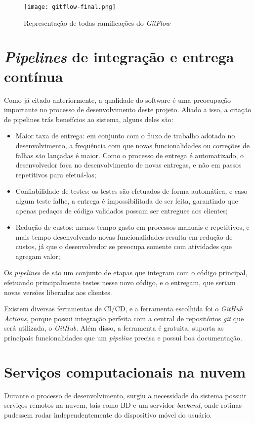 \begin{figure}[!htb]
    \centering
    \texttt{[image: gitflow-final.png]}
    \caption{Representação de todas ramificações do \textit{GitFlow}}
    \label{fig:gitflow4}
\end{figure}


\section{\textit{Pipelines} de integração e entrega contínua}\label{sec:pipelines}
Como já citado anteriormente, a qualidade do software é uma preocupação importante no processo de desenvolvimento deste projeto. Aliado a isso, a criação de pipelines trás benefícios ao sistema, alguns deles são:
\begin{itemize}
    \item Maior taxa de entrega: em conjunto com o fluxo de trabalho adotado no desenvolvimento, a frequência com que novas funcionalidades ou correções de falhas são lançadas é maior. Como o processo de entrega é automatizado, o desenvolvedor foca no desenvolvimento de novas entregas, e não em passos repetitivos para efetuá-las;
    \item Confiabilidade de testes: os testes são efetuados de forma automática, e caso algum teste falhe, a entrega é impossibilitada de ser feita, garantindo que apenas pedaços de código validados possam ser entregues aos clientes;
    \item Redução de custos: menos tempo gasto em processos manuais e repetitivos, e mais tempo desenvolvendo novas funcionalidades resulta em redução de custos, já que o desenvolvedor se preocupa somente com atividades que agregam valor;
\end{itemize}

Os \textit{pipelines} de  são um conjunto de etapas que integram com o código principal, efetuando principalmente testes nesse novo código, e o entregam, que seriam novas versões liberadas aos clientes.

Existem diversas ferramentas de CI/CD, e a ferramenta escolhida foi o \textit{GitHub Actions}, porque possui integração perfeita com a central de repositórios \textit{git} que será utilizada, o \textit{GitHub}. Além disso, a ferramenta é gratuita, suporta as principais funcionalidades que um \textit{pipeline} precisa e possui boa documentação.

\section{Serviços computacionais na nuvem}\label{sec:googlefirebase}
Durante o processo de desenvolvimento, surgiu a necessidade do sistema possuir serviços remotos na nuvem, tais como BD e um servidor \textit{backend}, onde rotinas pudessem rodar independentemente do dispositivo móvel do usuário.

